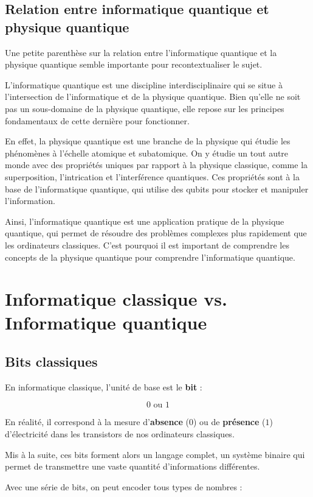 \documentclass{article}
\begin{document}
\subsection{Relation entre informatique quantique et physique quantique}

Une petite parenthèse sur la relation entre l'informatique quantique et la physique quantique semble importante pour recontextualiser le sujet.

L'informatique quantique est une discipline interdisciplinaire qui se situe à l'intersection de l'informatique et de la physique quantique. Bien qu'elle ne soit pas un sous-domaine de la physique quantique, elle repose sur les principes fondamentaux de cette dernière pour fonctionner.

En effet, la physique quantique est une branche de la physique qui étudie les phénomènes à l'échelle atomique et subatomique. On y étudie un tout autre monde avec des propriétés uniques par rapport à la physique classique, comme la superposition, l'intrication et l'interférence quantiques. Ces propriétés sont à la base de l'informatique quantique, qui utilise des qubits pour stocker et manipuler l'information.

Ainsi, l'informatique quantique est une application pratique de la physique quantique, qui permet de résoudre des problèmes complexes plus rapidement que les ordinateurs classiques. C'est pourquoi il est important de comprendre les concepts de la physique quantique pour comprendre l'informatique quantique.

\break\section{Informatique classique vs. Informatique quantique}
\subsection{Bits classiques}
En informatique classique, l’unité de base est le \textbf{bit} :

\[ 0 \text{ ou } 1 \]

En réalité, il correspond à la mesure d’\textbf{absence} ($0$) ou de \textbf{présence} ($1$) d’électricité dans les transistors de nos ordinateurs classiques.

Mis à la suite, ces bits forment alors un langage complet, un système binaire qui permet de transmettre une vaste quantité d'informations différentes.

Avec une série de bits, on peut encoder tous types de nombres :
\end{document}

